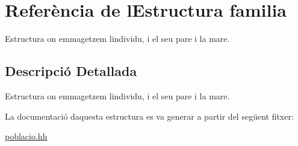 \hypertarget{structfamilia}{}\section{Referència de l\textquotesingle{}Estructura familia}
\label{structfamilia}


Estructura on emmagetzem l\textquotesingle{}individu, i el seu pare i la mare.  




\subsection{Descripció Detallada}
Estructura on emmagetzem l\textquotesingle{}individu, i el seu pare i la mare. 

La documentació d\textquotesingle{}aquesta estructura es va generar a partir del següent fitxer\+:\begin{DoxyCompactItemize}
\item 
\hyperlink{poblacio_8hh}{poblacio.\+hh}\end{DoxyCompactItemize}
